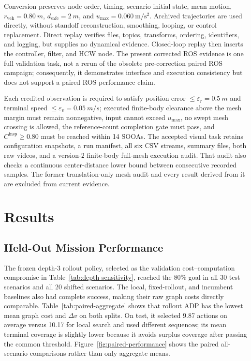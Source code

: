 \documentclass{IEEEtaes}
\newcommand{\unit}[2]{#1~#2}
\theoremstyle{remark}
\theoremstyle{plain}
\begin{document}
Conversion preserves node order, timing, scenario initial state, mean motion, $r_{\mathrm{veh}}=\unit{0.80}{m}$, $d_{\mathrm{safe}}=\unit{2}{m}$, and $u_{\max}=0.060~\mathrm{m/s^2}$. Archived trajectories are used directly, without standoff reconstruction, smoothing, looping, or control replacement. Direct replay verifies files, topics, transforms, ordering, identifiers, and logging, but supplies no dynamical evidence. Closed-loop replay then inserts the controller, filter, and HCW node. The present corrected ROS evidence is one full validation task, not a rerun of the obsolete pre-correction paired ROS campaign; consequently, it demonstrates interface and execution consistency but does not support a paired ROS performance claim.

Each credited observation is required to satisfy position error $\le\varepsilon_r=\unit{0.5}{m}$ and terminal speed $\le\varepsilon_v=\unit{0.05}{m/s}$; executed finite-body clearance above the mesh margin must remain nonnegative, input cannot exceed $u_{\max}$, no swept mesh crossing is allowed, the reference-count completion gate must pass, and $C^{\mathrm{insp}}\ge0.80$ must be reached within 14 SOOAs. The accepted visual task retains configuration snapshots, a run manifest, all six CSV streams, summary files, both raw videos, and a version-2 finite-body full-mesh execution audit. That audit also checks a continuous center-distance lower bound between consecutive recorded samples. The former translation-only mesh audit and every result derived from it are excluded from current evidence.

\section{Results}
\label{sec:results}

\subsection{Held-Out Mission Performance}

The frozen depth-3 rollout policy, selected as the validation cost--computation compromise in Table~\ref{tab:depth-sensitivity}, reached the 80\% goal in all 30 test scenarios and all 20 shifted scenarios. The local, fixed-rollout, and incumbent baselines also had complete success, making their raw graph costs directly comparable. Table~\ref{tab:paired-aggregate} shows that rollout ADP has the lowest mean graph cost and $\Delta v$ on both splits. On test, it selected 9.87 actions on average versus 10.17 for local search and used different sequences; its mean terminal coverage is slightly lower because it avoids surplus coverage after passing the common threshold. Figure~\ref{fig:paired-performance} shows the paired all-scenario comparisons rather than only aggregate means.
\end{document}
